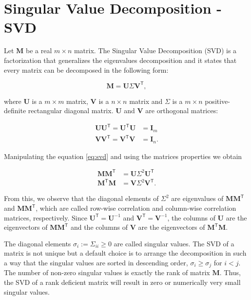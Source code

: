 \appendix

\chapter{Singular Value Decomposition - SVD}\label{appendix:svd}

Let $\mathbf{M}$ be a real $m \times n$ matrix. The Singular Value Decomposition (SVD) is a factorization that generalizes the eigenvalues decomposition and it states that every matrix can be decomposed in the following form:

\begin{equation}
    \mathbf{M} = \mathbf{U} \Sigma \mathbf{V}^{\mathsf{T}},
    \label{eq:svd}
\end{equation}

where $\mathbf{U}$ is a $m \times m$ matrix, $\mathbf{V}$ is a $n \times n$ matrix and $\Sigma$ is a $m \times n$ positive-definite rectangular diagonal matrix. $\mathbf{U}$ and $\mathbf{V}$ are orthogonal matrices:

\begin{align}
    \mathbf{U}\mathbf{U}^{\mathsf{T}} = \mathbf{U}^{\mathsf{T}}\mathbf{U} &= \mathbf{I}_{m} \\
    \mathbf{V}\mathbf{V}^{\mathsf{T}} = \mathbf{V}^{\mathsf{T}}\mathbf{V} &= \mathbf{I}_{n}. 
\end{align}

Manipulating the equation \eqref{eq:svd} and using the matrices properties we obtain

\begin{align}
    \mathbf{M}\mathbf{M}^{\mathsf{T}} &= \mathbf{U} \Sigma^2 \mathbf{U}^{\mathsf{T}} \\
    \mathbf{M}^{\mathsf{T}}\mathbf{M} &=  \mathbf{V} \Sigma^2 \mathbf{V}^{\mathsf{T}}.
\end{align}

From this, we observe that the diagonal elements of $\Sigma^2$ are eigenvalues of $\mathbf{M}\mathbf{M}^{\mathsf{T}}$ and $\mathbf{M}\mathbf{M}^{\mathsf{T}}$, which are called row-wise correlation and column-wise correlation matrices, respectively. Since $\mathbf{U}^{\mathsf{T}} = \mathbf{U}^{-1}$ and $\mathbf{V}^{\mathsf{T}} = \mathbf{V}^{-1}$, the columns of $\mathbf{U}$ are the eigenvectors of $\mathbf{M}\mathbf{M}^{\mathsf{T}}$ and the columns of $\mathbf{V}$ are the eigenvectors of $\mathbf{M}^{\mathsf{T}}\mathbf{M}$.

The diagonal elements $\sigma_i := \Sigma_{ii} \geq 0$ are called singular values. The SVD of a matrix is not unique but a default choice is to arrange the decomposition in such a way that the singular values are sorted in descending order, $\sigma_i \geq \sigma_j$ for $i < j$. The number of non-zero singular values is exactly the rank of matrix $\mathbf{M}$. Thus, the SVD of a rank deficient matrix will result in zero or numerically very small singular values. 

